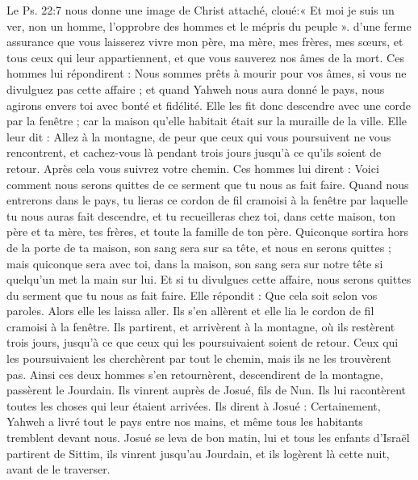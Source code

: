 \begin{multicols}{2}
{Le Ps. 22:7 nous donne une image de Christ attaché, cloué:« Et moi je suis un ver, non un homme, l’opprobre des hommes et le mépris du peuple ».} d’une ferme assurance que vous laisserez vivre mon père, ma mère, mes frères, mes sœurs, et tous ceux qui leur appartiennent, et que vous sauverez nos âmes de la mort.
Ces hommes lui répondirent : Nous sommes prêts à mourir pour vos âmes, si vous ne divulguez pas cette affaire ; et quand Yahweh nous aura donné le pays, nous agirons envers toi avec bonté et fidélité.
Elle les fit donc descendre avec une corde par la fenêtre ; car la maison qu’elle habitait était sur la muraille de la ville.
Elle leur dit : Allez à la montagne, de peur que ceux qui vous poursuivent ne vous rencontrent, et cachez-vous là pendant trois jours jusqu’à ce qu’ils soient de retour. Après cela vous suivrez votre chemin.
Ces hommes lui dirent : Voici comment nous serons quittes de ce serment que tu nous as fait faire.
Quand nous entrerons dans le pays, tu lieras ce cordon de fil cramoisi à la fenêtre par laquelle tu nous auras fait descendre, et tu recueilleras chez toi, dans cette maison, ton père et ta mère, tes frères, et toute la famille de ton père.
Quiconque sortira hors de la porte de ta maison, son sang sera sur sa tête, et nous en serons quittes ; mais quiconque sera avec toi, dans la maison, son sang sera sur notre tête si quelqu’un met la main sur lui.
Et si tu divulgues cette affaire, nous serons quittes du serment que tu nous as fait faire.
Elle répondit : Que cela soit selon vos paroles. Alors elle les laissa aller. Ils s’en allèrent et elle lia le cordon de fil cramoisi à la fenêtre.
Ils partirent, et arrivèrent à la montagne, où ils restèrent trois jours, jusqu’à ce que ceux qui les poursuivaient soient de retour. Ceux qui les poursuivaient les cherchèrent par tout le chemin, mais ils ne les trouvèrent pas.
Ainsi ces deux hommes s’en retournèrent, descendirent de la montagne, passèrent le Jourdain. Ils vinrent auprès de Josué, fils de Nun. Ils lui racontèrent toutes les choses qui leur étaient arrivées.
Ils dirent à Josué : Certainement, Yahweh a livré tout le pays entre nos mains, et même tous les habitants tremblent devant nous.
\VerseOne{}Josué se leva de bon matin, lui et tous les enfants d’Israël partirent de Sittim, ils vinrent jusqu’au Jourdain, et ils logèrent là cette nuit, avant de le traverser.

\end{multicols}
